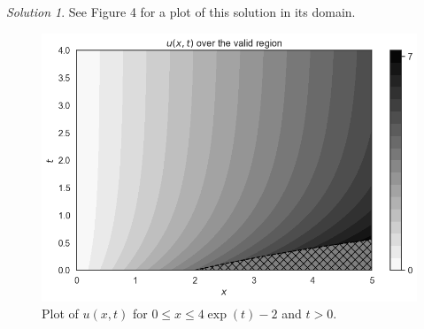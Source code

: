 \documentclass[12pt,a4paper]{article}
\theoremstyle{definition}
\theoremstyle{remark}
\newtheorem*{solution}{Solution}
\begin{document}
\begin{solution}
    See Figure 4 for a plot of this solution in its domain. 

    \begin{figure}[h]
      \centering
      \includegraphics[width=\textwidth]{Fig4.png}
      \caption{Plot of $u(x, t)$ for $0 \le x \le 4 \exp(t) -2$ and $t>0$.}
      \label{fig:fig4}
    \end{figure}  

  \end{solution}
\end{document}
